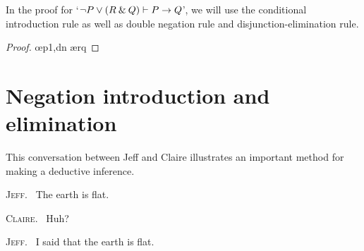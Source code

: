 \begin{earg}
\item In the proof for `${\neg} P \vee (R \mathbin{\&} Q) \vdash P \rightarrow Q$', we will use the conditional introduction rule as well as double negation rule and disjunction-elimination rule. 

\begin{proof}
	 \pr{}	
	\open
		\as{}
		 
		 \oe{p1,dn}
		 \ae{rq}
	\close
\end{proof}


\end{earg}


\section{Negation introduction and elimination}\label{s:neg-rules}

This conversation between Jeff and Claire illustrates an important method for making a deductive inference.\smallskip

{\textsc{\small Jeff.}}~ The earth is flat.\vspace{1pt}

{\textsc{\small Claire.}}~ Huh?\vspace{1pt}

{\textsc{\small Jeff.}}~ I said that the earth is flat.\vspace{1pt}

